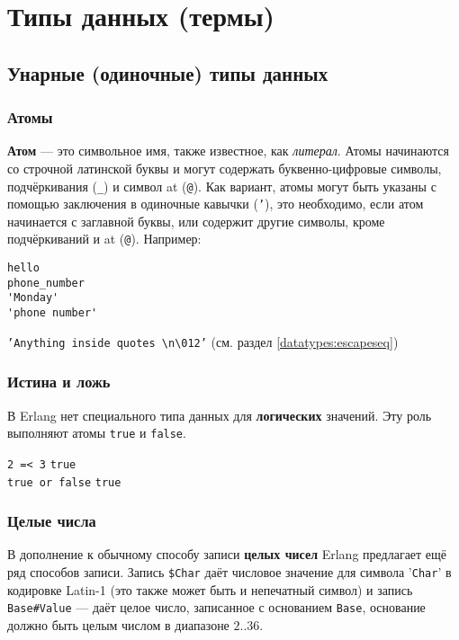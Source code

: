 \chapter{Типы данных (термы)}
\label{datatypes}


\section{Унарные (одиночные) типы данных}


\subsection{Атомы}
\label{datatypes:atom}
\textbf{Атом} --- это символьное имя, также известное, как \emph{литерал}.
Атомы начинаются со строчной латинской буквы и могут содержать буквенно-цифровые
символы, подчёркивания (\texttt{\_}) и символ at (\texttt{@}).
Как вариант, атомы могут быть указаны с помощью заключения в одиночные кавычки
(\texttt{'}), это необходимо, если атом начинается с заглавной буквы, или содержит
другие символы, кроме подчёркиваний и at (\texttt{@}). Например:

\begin{verbatim}
hello
phone_number
'Monday'
'phone number'
\end{verbatim}

\texttt{'Anything inside quotes \textbackslash n\textbackslash 012'}
\hfill(см. раздел \ref{datatypes:escapeseq})


\subsection{Истина и ложь}
\label{datatypes:boolean}
В Erlang нет специального типа данных для \textbf{логических} значений. Эту роль
выполняют атомы \texttt{true} и \texttt{false}.

\texttt{2 =< 3} \resultingin \texttt{true} \\
\texttt{true or false} \resultingin \texttt{true}


\subsection{Целые числа}
\label{datatypes:integer}

В дополнение к обычному способу записи \textbf{целых чисел} Erlang предлагает
ещё ряд способов записи. Запись \texttt{\$Char} даёт числовое значение для 
символа '\texttt{Char}' в кодировке Latin-1 (это также может быть и непечатный
символ) и запись \texttt{Base\#Value} --- даёт целое число, записанное с 
основанием \texttt{Base}, основание должно быть целым числом в диапазоне $2..36$.

